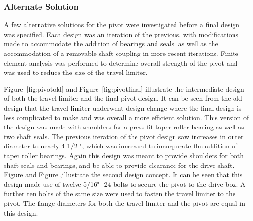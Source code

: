\subsubsection{Alternate Solution}

A few alternative solutions for the pivot were investigated before a final design was specified. Each design was an iteration of the previous, with modifications made to accommodate the addition of bearings and seals, as well as the accommodation of a removable shaft coupling in more recent iterations. Finite element analysis was performed to determine overall strength of the pivot and was used to reduce the size of the travel limiter.

Figure~\ref{fig:pivotold} and Figure~\ref{fig:pivotfinal} illustrate the intermediate design of both the travel limiter and the final pivot design. It can be seen from the old design that the travel limiter underwent design change where the final design is less complicated to make and was overall a more efficient solution. This version of the design was made with shoulders for a press fit taper roller bearing as well as two shaft seals. The previous iteration of the pivot design saw increases in outer diameter to nearly 4 1/2 ", which was increased to incorporate the addition of taper roller bearings. Again this design was meant to provide shoulders for both shaft seals and bearings, and be able to provide clearance for the drive shaft. Figure and Figure ,illustrate the second design concept. It can be seen that this design made use of twelve 5/16"- 24 bolts to secure the pivot to the drive box. A further ten bolts of the same size were used to fasten the travel limiter to the pivot. The flange diameters for both the travel limiter and the pivot are equal in this design.

